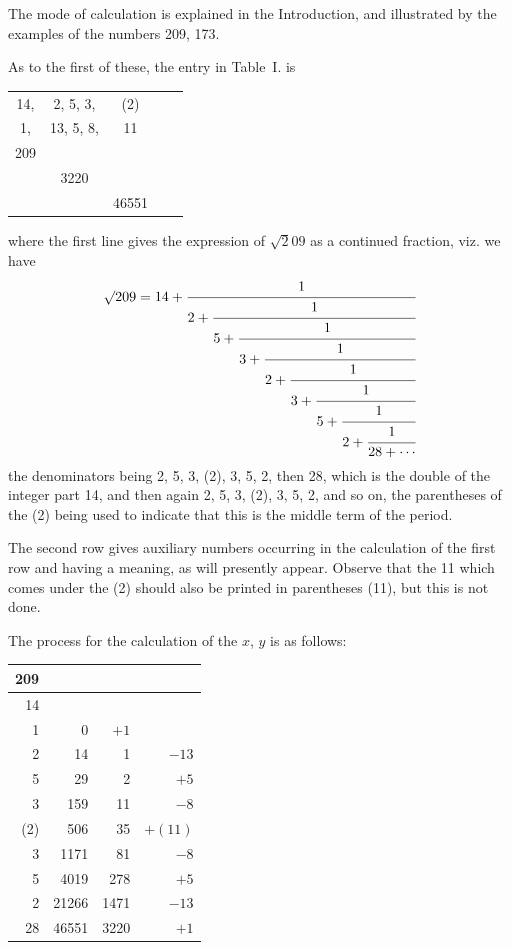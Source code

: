 \documentclass[12pt,a4paper]{article}
\begin{document}
The mode of calculation is explained in the Introduction, and illustrated by the examples of the numbers 209, 173.

As to the first of these, the entry in Table~I. is
\begin{center}
\begin{tabular}{ccccc}
14, & 2, 5, 3, & (2) & & \\
1, & 13, 5, 8, & 11 & & \\
209 & & & & \\
& 3220 & & & \\
& & 46551 & &
\end{tabular}
\end{center}
where the first line gives the expression of $\surd 209$ as a continued fraction, viz. we have
\[
\surd 209 = 14 +
\cfrac{1}{2+
 \cfrac{1}{5+
  \cfrac{1}{3+
   \cfrac{1}{2+
    \cfrac{1}{3+
     \cfrac{1}{5+
      \cfrac{1}{2+
       \cfrac{1}{28+\cdots}}}}}}}}
\]
the denominators being 2, 5, 3, (2), 3, 5, 2, then 28, which is the double of the integer part 14, and then again 2, 5, 3, (2), 3, 5, 2, and so on, the parentheses of the (2) being used to indicate that this is the middle term of the period.

The second row gives auxiliary numbers occurring in the calculation of the first row and having a meaning, as will presently appear. Observe that the 11 which comes under the (2) should also be printed in parentheses (11), but this is not done.

The process for the calculation of the $x$, $y$ is as follows:

\begin{center}
\begin{tabular}{r|r|r|r}
209 & & & \\ \hline
14 & & & \\
1 & 0 & $+1$ & \\
2 & 14 & 1 & $-13$ \\
5 & 29 & 2 & $+5$ \\
3 & 159 & 11 & $-8$ \\
(2) & 506 & 35 & $+(11)$ \\
3 & 1171 & 81 & $-8$ \\
5 & 4019 & 278 & $+5$ \\
2 & 21266 & 1471 & $-13$ \\
28 & 46551 & 3220 & $+1$
\end{tabular}
\end{center}
\end{document}
